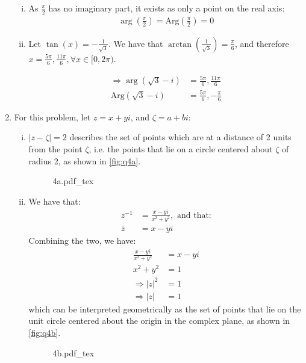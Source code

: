 \documentclass[a4paper, titlepage, DIV=14]{scrartcl}
\newcommand{\incfig}[1]{%
    \def\svgwidth{0.45\columnwidth}
    {#1.pdf_tex}
}
\begin{document}
\begin{enumerate}
\begin{enumerate}[i)]
        \item As $\frac{\pi}{2}$ has no imaginary part, it exists as only a point
        on the real axis:
        \begin{align*}
            \arg({\frac{\pi}{2}})=\text{Arg}(\frac{\pi}{2})=0
        \end{align*}

        \item Let $\tan(x) = -\frac{1}{\sqrt{3}}$. We have that 
        $\arctan(\frac{1}{\sqrt{3}}) = \frac{\pi}{6}$, and therefore 
        $x=\frac{5\pi}{6},\frac{11\pi}{6}, \forall x \in [0, 2\pi)$. 

        \begin{align*}
            \Rightarrow \arg(\sqrt{3}-i) &= \frac{5\pi}{6},\frac{11\pi}{6} \\
            \text{Arg}(\sqrt{3}-i) &= \frac{5\pi}{6}, -\frac{\pi}{6}
        \end{align*}
        \end{enumerate}

        \item For this problem, let $z=x+yi$, and $\zeta=a+bi$:
        \begin{enumerate}[i)]
            \item $|z-\zeta|=2$ describes the set of points which are at a distance
            of 2 units from the point $\zeta$, i.e. the points that lie
            on a circle centered about $\zeta$ of radius 2, as shown in 
            \autoref{fig:q4a}.
            \begin{figure}[!h]
                \centering
                \incfig{4a}
                \caption{}
                \label{fig:q4a}
            \end{figure}

            \item 
            We have that:
            \begin{align*}
                z^{-1} &= \frac{x-yi}{x^{2}+y^{2}}, \text{ and that:} \\
                \bar{z} &= x-yi
            \end{align*}
            Combining the two, we have:
            \begin{align*}
                \frac{x-yi}{x^{2}+y^{2}} &= x-yi \\
                x^{2}+y^{2} &= 1 \\
                \Rightarrow |z|^{2} &= 1 \\
                \Rightarrow |z| &= 1
            \end{align*} which can be interpreted geometrically as the set of points that lie on the unit
            circle centered about the origin in the complex plane, as shown in \autoref{fig:q4b}.
            \begin{figure}[!h]
                \centering
                \incfig{4b}
                \caption{}
                \label{fig:q4b}
            \end{figure}


\end{enumerate}
\end{enumerate}
\end{document}
